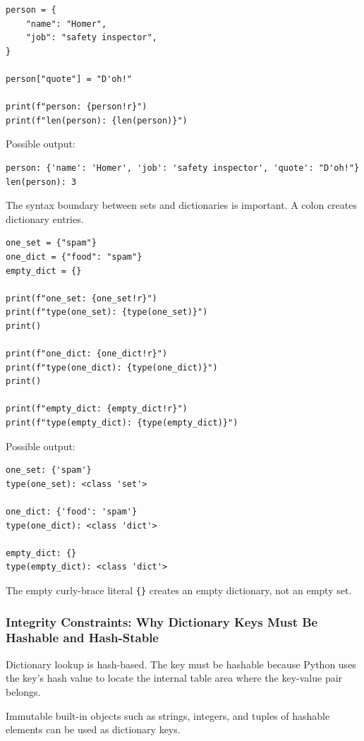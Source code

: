 \begin{verbatim}
person = {
    "name": "Homer",
    "job": "safety inspector",
}

person["quote"] = "D'oh!"

print(f"person: {person!r}")
print(f"len(person): {len(person)}")
\end{verbatim}

Possible output:

\begin{verbatim}
person: {'name': 'Homer', 'job': 'safety inspector', 'quote': "D'oh!"}
len(person): 3
\end{verbatim}

The syntax boundary between sets and dictionaries is important. A colon creates dictionary entries.

\begin{verbatim}
one_set = {"spam"}
one_dict = {"food": "spam"}
empty_dict = {}

print(f"one_set: {one_set!r}")
print(f"type(one_set): {type(one_set)}")
print()

print(f"one_dict: {one_dict!r}")
print(f"type(one_dict): {type(one_dict)}")
print()

print(f"empty_dict: {empty_dict!r}")
print(f"type(empty_dict): {type(empty_dict)}")
\end{verbatim}

Possible output:

\begin{verbatim}
one_set: {'spam'}
type(one_set): <class 'set'>

one_dict: {'food': 'spam'}
type(one_dict): <class 'dict'>

empty_dict: {}
type(empty_dict): <class 'dict'>
\end{verbatim}

The empty curly-brace literal \texttt{\{\}} creates an empty dictionary, not an empty set.

\subsubsection{Integrity Constraints: Why Dictionary Keys Must Be Hashable and Hash-Stable}

Dictionary lookup is hash-based. The key must be hashable because Python uses the key's hash value to locate the internal table area where the key-value pair belongs.

Immutable built-in objects such as strings, integers, and tuples of hashable elements can be used as dictionary keys.

